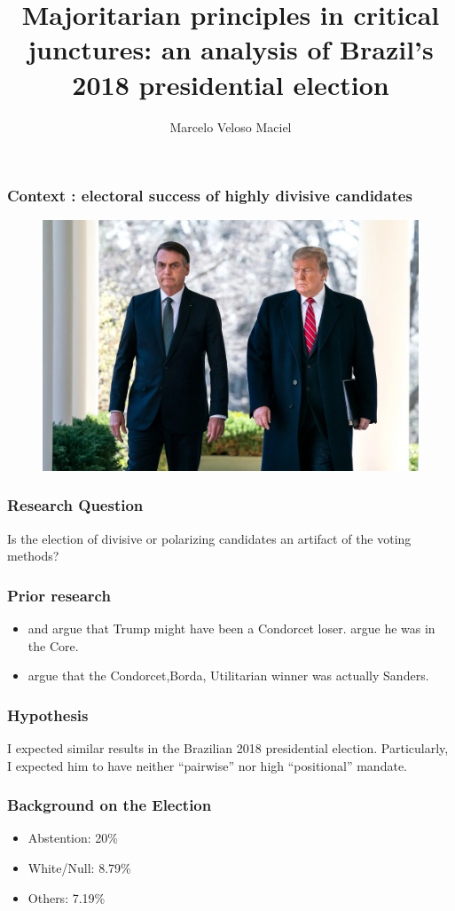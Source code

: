 \documentclass[xcolor={svgnames}]{beamer}
\title{Majoritarian principles in critical junctures: an analysis of Brazil's
  2018 presidential election}
\date{}
\author{Marcelo Veloso Maciel}
\institute{University of California, Irvine}
\begin{document}
\maketitle

\begin{frame}
\frametitle{Context : electoral success of highly divisive candidates}
  \begin{figure}[H] \centering \includegraphics[width=\textwidth]{./trumpolnaro.png}
 \end{figure}
\end{frame}

\begin{frame}
  \frametitle{Research Question }
  Is the election of divisive or polarizing candidates an artifact of the voting
  methods?
\end{frame}

\begin{frame}
  \frametitle{Prior research}
  \begin{itemize}
    \item \textcite{potthoff2021condorcet} and \textcite{kurrild2018trump} argue
          that Trump might have been a Condorcet loser. \textcite{woon2020trump}
          argue he was in the Core.
    \item \textcite{igersheim22_compar_votin_method} argue that the
          Condorcet,Borda, Utilitarian winner was actually Sanders.
  \end{itemize}
\end{frame}

\begin{frame}
  \frametitle{Hypothesis}
  I expected similar results in the Brazilian 2018 presidential election.
  Particularly, I expected him to have neither ``pairwise'' nor high
  ``positional'' mandate.
\end{frame}
\begin{frame}
  \frametitle{Background on the Election }
  \begin{itemize}
  \item Abstention: 20\%
  \item White/Null: 8.79\%
  \item Others: 7.19\%
  \end{itemize}
\end{frame}
\end{document}
